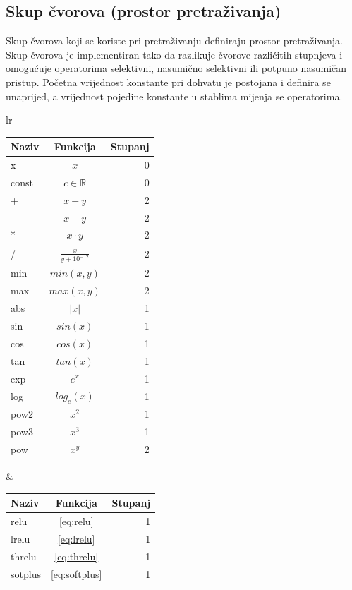 \documentclass[times, utf8, numeric, diplomski]{fer}
\def\realnum{\mathbb{R}}
\begin{document}
\subsection{Skup čvorova (prostor pretraživanja)}
\label{sec:node_set}
Skup čvorova koji se koriste pri pretraživanju definiraju prostor pretraživanja. Skup čvorova je implementiran tako da razlikuje čvorove različitih stupnjeva i omogućuje operatorima selektivni, nasumično selektivni ili potpuno nasumičan pristup. Početna vrijednost konstante pri dohvatu je postojana i definira se unaprijed, a vrijednost pojedine konstante u stablima mijenja se operatorima.

\begin{table}[H]
\centering
\begin{tabular}[t]{lr}
\begin{tabular}[t]{l|c|r}
\textbf{Naziv} & \textbf{Funkcija} & \textbf{Stupanj} \\
\hline
x		& $x$					& 0 \\
const	& $c \in \realnum$		& 0 \\
\hline
+		& $x + y$				& 2 \\
-		& $x - y$				& 2 \\
*		& $x \cdot y$			& 2 \\
/		& $\frac{x}{y + 10^{-12}}$	& 2 \\
\hline
min		& $min(x, y)$			& 2 \\
max		& $max(x, y)$			& 2 \\
abs		& $|x|$					& 1 \\
\hline
sin		& $sin(x)$				& 1 \\
cos		& $cos(x)$				& 1 \\
tan		& $tan(x)$				& 1 \\
\hline
exp		& $e^x$					& 1 \\
log		& $log_e(x)$				& 1 \\
pow2		& $x^2$					& 1 \\
pow3		& $x^3$					& 1 \\
pow		& $x^y$					& 2 \\
\end{tabular}
& \quad
\begin{tabular}[t]{l|c|r}
\textbf{Naziv} & \textbf{Funkcija} & \textbf{Stupanj} \\
\hline
relu		& \eqref{eq:relu}		& 1 \\
lrelu	& \eqref{eq:lrelu}		& 1 \\
threlu 	& \eqref{eq:threlu}		& 1 \\
sotplus	& \eqref{eq:softplus}	& 1 \\

\end{tabular}
\end{tabular}
\end{table}
\end{document}
